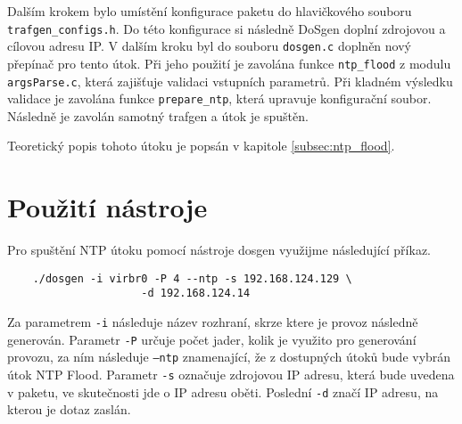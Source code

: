 Dalším krokem bylo umístění konfigurace paketu do hlavičkového souboru \newline \texttt{trafgen\_configs.h}. Do této konfigurace si následně DoSgen doplní zdrojovou a cílovou adresu IP. 
V dalším kroku byl do souboru \texttt{dosgen.c} doplněn nový přepínač pro tento útok. Při jeho použití je zavolána funkce \texttt{ntp\_flood} z modulu \texttt{argsParse.c}, která zajišťuje validaci vstupních parametrů. Při kladném výsledku validace je zavolána funkce \texttt{prepare\_ntp}, která upravuje konfigurační soubor. Následně je zavolán samotný trafgen a útok je spuštěn.

Teoretický popis tohoto útoku je popsán v kapitole \ref{subsec:ntp_flood}.


\section{Použití nástroje}
Pro spuštění NTP útoku pomocí nástroje dosgen využijme následující příkaz.
\begin{lstlisting}
	./dosgen -i virbr0 -P 4 --ntp -s 192.168.124.129 \
                     -d 192.168.124.14
\end{lstlisting}

Za parametrem \texttt{-i} následuje název rozhraní, skrze ktere je provoz následně generován. Parametr \texttt{-P} určuje počet jader, kolik je využito pro generování provozu, za ním následuje \texttt{--ntp} znamenající, že z dostupných útoků bude vybrán útok NTP Flood. Parametr \texttt{-s} označuje zdrojovou IP adresu, která bude uvedena v paketu, ve skutečnosti jde o IP adresu oběti. Poslední \texttt{-d} značí IP adresu, na kterou je dotaz zaslán.

